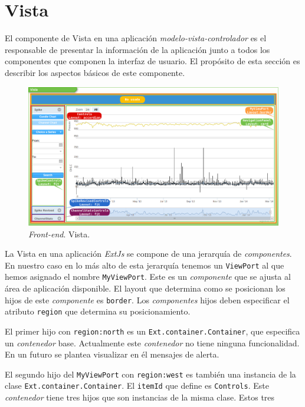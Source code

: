\section{Vista}
	El componente de Vista en una aplicación \emph{modelo-vista-controlador}\cite{MVCWiki} es el responsable de presentar la información de la
	aplicación junto a todos los componentes que componen la interfaz de usuario. El propósito de esta sección es describir los aspectos básicos
	de este componente.
	\begin{figure}[h]
		\centering
		\includegraphics[keepaspectratio, width=1\textwidth]{./img/vista.png}
		\caption{\emph{Front-end}. Vista.}   
		\label{fig:vista}
	\end{figure}
	\par
	La Vista en una aplicación \emph{ExtJs} se compone de una jerarquía de \emph{componentes}. En nuestro caso en lo más alto de esta jerarquía
	tenemos un \texttt{ViewPort} al que hemos asignado el nombre \texttt{MyViewPort}. Este es un \emph{componente} que se ajusta al área de
	aplicación disponible. El layout que determina como se posicionan los hijos de este \emph{componente} es \texttt{border}. Los
	\emph{componentes} hijos deben especificar el atributo \texttt{region} que determina su posicionamiento.
	\par
	El primer hijo con \texttt{region:north} es un \texttt{Ext.container.Container}, que especifica un \emph{contenedor} base. Actualmente este
	\emph{contenedor} no tiene ninguna funcionalidad. En un futuro se plantea visualizar en él mensajes de alerta.
	\par
	El segundo hijo del \texttt{MyViewPort} con \texttt{region:west} es también una instancia de la clase \texttt{Ext.container.Container}. El
	\texttt{itemId} que define es \texttt{Controls}. Este \emph{contenedor} tiene tres hijos que son instancias de la misma clase. Estos tres
